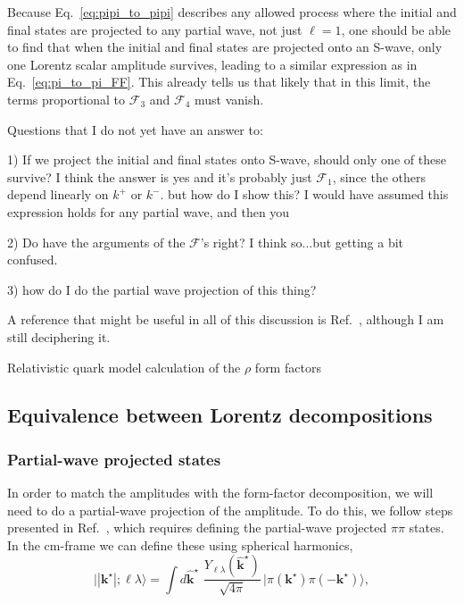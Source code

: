Because Eq.~\ref{eq:pipi_to_pipi} describes any allowed process where the initial and final states are projected to any partial wave, not just $\ell=1$, one should be able to find that when the initial and final states are projected onto an S-wave, only one Lorentz scalar amplitude survives, leading to a similar expression as in Eq.~\ref{eq:pi_to_pi_FF}.  This already tells us that likely that in this limit, the terms proportional to $\mathcal{F}_{3}$ and $\mathcal{F}_{4}$ must vanish.




{\raul 
Questions that I do not yet have an answer to:

	1) If we project the initial and final states onto S-wave, should only one of these survive? I think the answer is yes and it's probably just $\mathcal{F}_1$, since the others depend linearly on $k^+$ or $k^-$. but how do I show this? I would have assumed this expression holds for any partial wave, and then you 
	
	2) Do have the arguments of the $\mathcal{F}$'s right? I think so...but getting a bit confused. 
	
	3) how do I do the partial wave projection of this thing? 
}

{\raul A reference that might be useful in all of this discussion is Ref.~\cite{Krutov:2004vc}, although I am still deciphering it.}

{\raul Relativistic quark model calculation of the $\rho$ form factors ~\cite{Krutov:2004qx}}


 \subsection{Equivalence between Lorentz decompositions \label{sec:equivalence}}
 
 \subsubsection{Partial-wave projected states}
In order to match the amplitudes with the form-factor decomposition, we will need to do a partial-wave projection of the amplitude. To do this, we follow steps presented in Ref.~\cite{Briceno:2016kkp}, which requires defining the partial-wave projected $\pi\pi$ states. In the cm-frame we can define these using spherical harmonics,
\begin{equation}
\big| |\textbf{k}^\star|; \ell \lambda \big\rangle = \int \! d\hat{\mathbf{k}}^\star \, \,\frac{Y_{\ell \lambda}(\hat{\mathbf{k}}^\star)}{\sqrt{4\pi}}\, \big| \pi(\textbf{k}^\star) \pi(-\textbf{k}^\star)\big\rangle,
\label{eq:PW_proj}
\end{equation}

